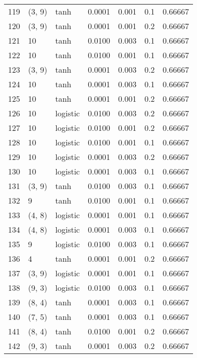 \begin{tabular}{lllrrrr}
119 &      (3, 9) &      tanh &  0.0001 &  0.001 &  0.1 &   0.66667 \\
120 &      (3, 9) &      tanh &  0.0001 &  0.001 &  0.2 &   0.66667 \\
121 &          10 &      tanh &  0.0100 &  0.003 &  0.1 &   0.66667 \\
122 &          10 &      tanh &  0.0100 &  0.001 &  0.1 &   0.66667 \\
123 &      (3, 9) &      tanh &  0.0001 &  0.003 &  0.2 &   0.66667 \\
124 &          10 &      tanh &  0.0001 &  0.003 &  0.1 &   0.66667 \\
125 &          10 &      tanh &  0.0001 &  0.001 &  0.2 &   0.66667 \\
126 &          10 &  logistic &  0.0100 &  0.003 &  0.2 &   0.66667 \\
127 &          10 &  logistic &  0.0100 &  0.001 &  0.2 &   0.66667 \\
128 &          10 &  logistic &  0.0100 &  0.001 &  0.1 &   0.66667 \\
129 &          10 &  logistic &  0.0001 &  0.003 &  0.2 &   0.66667 \\
130 &          10 &  logistic &  0.0001 &  0.003 &  0.1 &   0.66667 \\
131 &      (3, 9) &      tanh &  0.0100 &  0.003 &  0.1 &   0.66667 \\
132 &           9 &      tanh &  0.0100 &  0.001 &  0.1 &   0.66667 \\
133 &      (4, 8) &  logistic &  0.0001 &  0.001 &  0.1 &   0.66667 \\
134 &      (4, 8) &  logistic &  0.0001 &  0.003 &  0.1 &   0.66667 \\
135 &           9 &  logistic &  0.0100 &  0.003 &  0.1 &   0.66667 \\
136 &           4 &      tanh &  0.0001 &  0.001 &  0.2 &   0.66667 \\
137 &      (3, 9) &  logistic &  0.0001 &  0.001 &  0.1 &   0.66667 \\
138 &      (9, 3) &  logistic &  0.0100 &  0.003 &  0.1 &   0.66667 \\
139 &      (8, 4) &      tanh &  0.0001 &  0.003 &  0.1 &   0.66667 \\
140 &      (7, 5) &      tanh &  0.0001 &  0.003 &  0.1 &   0.66667 \\
141 &      (8, 4) &      tanh &  0.0100 &  0.001 &  0.2 &   0.66667 \\
142 &      (9, 3) &      tanh &  0.0001 &  0.003 &  0.2 &   0.66667 \\

\end{tabular}
